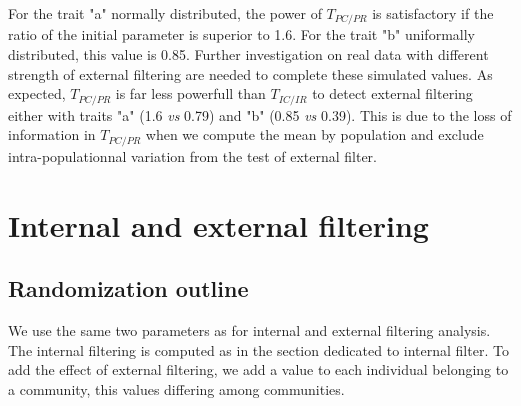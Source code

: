 \documentclass[12pt]{article}\usepackage[]{graphicx}\usepackage[]{color}
\begin{document}
For the trait "a" normally distributed, the power of $T_{PC/PR}$ is satisfactory if the ratio of the initial parameter is superior to
 1.6. For the trait "b" uniformally distributed, this value is 0.85. 
 Further investigation on real data with different strength of external filtering are needed to complete these simulated values. As expected, $T_{PC/PR}$ is far less powerfull than $T_{IC/IR}$ to detect external filtering either with traits "a" (1.6 \textit{vs} 0.79) and "b" (0.85 \textit{vs} 0.39). This is due to the loss of information in $T_{PC/PR}$ when we compute the mean by population and exclude intra-populationnal variation from the test of external filter. 




































\cleardoublepage

\section{Internal and external filtering}

  \subsection{Randomization outline}
We use the same two parameters as for internal and external filtering analysis. The internal filtering is computed as in the section dedicated to internal filter. To add the effect of external filtering, we add a value to each individual belonging to a community, this values differing among communities.
\end{document}
